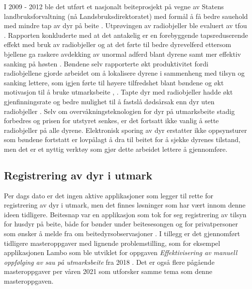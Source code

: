 I 2009 - 2012 ble det utført et nasjonalt beiteprosjekt på vegne av Statens landbruksforvaltning (nå Landsbruksdirektoratet) med formål å få bedre sauehold med mindre tap av dyr på beite \cite{statenslandbruksforvaltningNasjonaltBeiteprosjekt20092013}. Utprøvingen av  radiobjeller ble evaluert av \acrfull{tfou} \cite[~s.8]{statenslandbruksforvaltningNasjonaltBeiteprosjekt20092013}. Rapporten konkluderte med at det antakelig er en forebyggende tapsreduserende effekt med bruk av radiobjeller og at det førte til bedre dyrevelferd ettersom bjellene ga raskere avdekking av unormal adferd blant dyrene samt mer effektiv sanking på høsten \cite[~s.40]{statenslandbruksforvaltningNasjonaltBeiteprosjekt20092013}. Bøndene selv rapporterte økt produktivitet fordi radiobjellene gjorde arbeidet om å lokalisere dyrene i sammenheng med tilsyn og sanking lettere, som igjen førte til høyere tilfredshet blant bøndene og økt motivasjon til å bruke utmarksbeite \cite[~s.41]{statenslandbruksforvaltningNasjonaltBeiteprosjekt20092013}, \cite[~s.60]{kvamRoleAdvisoryServices2019}. Tapte dyr med radiobjeller hadde økt gjenfinningsrate og bedre mulighet til å fastslå dødsårsak enn dyr uten radiobjeller \cite[~s.40]{statenslandbruksforvaltningNasjonaltBeiteprosjekt20092013}. 
\newline
\newline
Selv om overvåkningsteknologien for dyr på utmarksbeite stadig forbedres og prisen for utstyret senkes, er det fortsatt ikke vanlig å sette radiobjeller på alle dyrene. Elektronisk sporing av dyr erstatter ikke oppsynsturer som bøndene fortstatt er lovpålagt å dra til beitet for å sjekke dyrenes tilstand, men det er et nyttig verktøy som gjør dette arbeidet lettere å gjennomføre.

\subsection{Registrering av dyr i utmark} 
Per dags dato er det ingen aktive applikasjoner som legger til rette for registrering av dyr i utmark, men det finnes løsninger som har vært innom denne ideen tidligere. Beitesnap var en applikasjon som tok for seg registrering av tilsyn for husdyr på beite, både for bønder under beitesesongen og for privatpersoner som ønsker å melde fra om beitedyrsobservasjoner \cite{BeitesnapRevolusjonerendeVerktoy}. I tillegg er det gjennomført tidligere masteroppgaver med lignende problemstilling, som for eksempel applikasjonen Lambo som ble utviklet for oppgaven \textit{Effektivisering av manuell oppfølging av sau på utmarksbeite} fra 2018 \cite{dystheEffektiviseringAvManuell2018}. Det er også flere pågående masteroppgaver per våren 2021 som utforsker samme tema som denne masteroppgaven.  

